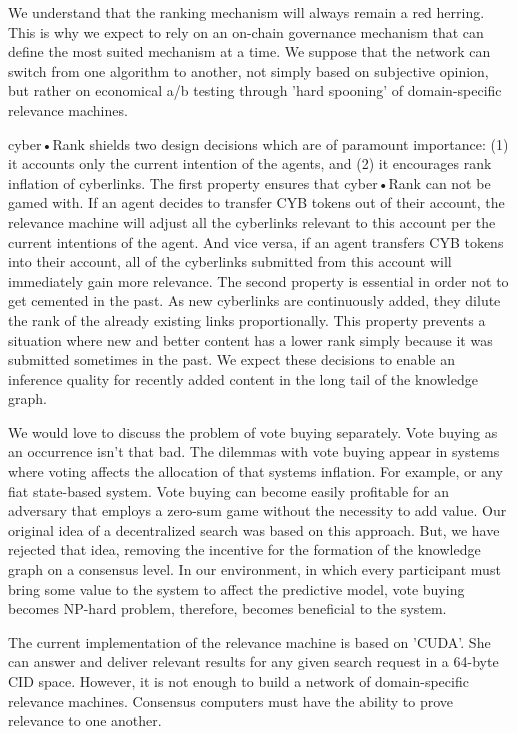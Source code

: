\documentclass[8pt,oneside]{amsart}
\newcommand{\linkgreen}[2]{\href{#1}{\color{green}{#2}}}
\begin{document}
We understand that the ranking mechanism will always remain a red herring. This is why we expect to rely on an on-chain governance mechanism that can define the most suited mechanism at a time. We suppose that the network can switch from one algorithm to another, not simply based on subjective opinion, but rather on economical a/b testing through 'hard spooning' of domain-specific relevance machines.

cyber•Rank shields two design decisions which are of paramount importance: (1) it accounts only the current intention of the agents, and (2) it encourages rank inflation of cyberlinks. The first property ensures that cyber•Rank can not be gamed with. If an agent decides to transfer CYB tokens out of their account, the relevance machine will adjust all the cyberlinks relevant to this account per the current intentions of the agent. And vice versa, if an agent transfers CYB tokens into their account, all of the cyberlinks submitted from this account will immediately gain more relevance. The second property is essential in order not to get cemented in the past. As new cyberlinks are continuously added, they dilute the rank of the already existing links proportionally. This property prevents a situation where new and better content has a lower rank simply because it was submitted sometimes in the past. We expect these decisions to enable an inference quality for recently added content in the long tail of the knowledge graph.

We would love to discuss the problem of vote buying separately. Vote buying as an occurrence isn't that bad. The dilemmas with vote buying appear in systems where voting affects the allocation of that systems inflation. For example, \linkgreen{http://ipfs.io/ipfs/QmepU77tqMAHHuiSASUvUnu8f8ENuPF2Kfs97WjLn8vAS3}{Steem}
or any fiat state-based system. Vote buying can become easily profitable for an adversary that employs a zero-sum game without the necessity to add value. Our original idea of a decentralized search was based on this approach. But, we have rejected that idea, removing the incentive for the formation of the knowledge graph on a consensus level. In our environment, in which every participant must bring some value to the system to affect the predictive model, vote buying becomes NP-hard problem, therefore, becomes beneficial to the system.

The current implementation of the relevance machine is based on 'CUDA'. She can answer and deliver relevant results for any given search request in a 64-byte CID space. However, it is not enough to build a network of domain-specific relevance machines. Consensus computers must have the ability to prove relevance to one another.
\end{document}
